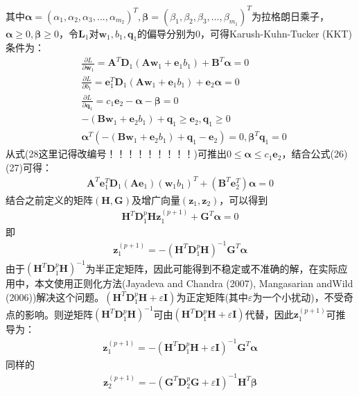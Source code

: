 \documentclass{article}
\theoremstyle{definition}
\theoremstyle{definition}
\theoremstyle{remark}
\begin{document}
其中$\pmb{\alpha}=(\alpha_1,\alpha_2,\alpha_3,…,\alpha_{m_2})^T, \pmb{\beta}=(\beta_1,\beta_2,\beta_3,…,\beta_{m_1})^T$为拉格朗日乘子，$\pmb{\alpha}\geq 0,\pmb{\beta}\geq 0$，令$\pmb{L}_1$对$\mathbf{w}_1,b_1,\mathbf{q}_1$的偏导分别为0，可得Karush-Kuhn-Tucker (KKT)条件为：
\begin{align}
&\frac{\partial{L}}{\partial{\mathbf{w}_1}}=\mathbf{A}^T\mathbf{D}_1(\mathbf{Aw}_1+\mathbf{e}_1b_1)+\mathbf{B}^T\pmb{\alpha}=0\\
&\frac{\partial{L}}{\partial{b_1}}=\mathbf{e}_1^T\mathbf{D}_1(\mathbf{Aw}_1+\mathbf{e}_1b_1)+\mathbf{e}_2\pmb{\alpha}=0\\
&\frac{\partial{L}}{\partial{\mathbf{q}_1}}=c_1\mathbf{e}_2-\pmb{\alpha}-\pmb{\beta}=0\\
&-(\mathbf{Bw}_1+\mathbf{e}_2b_1)+\mathbf{q}_1 \geq \mathbf{e}_2, \mathbf{q}_1\geq 0\\
&\pmb{\alpha}^T(-(\mathbf{Bw}_1+\mathbf{e}_2b_1)+\mathbf{q}_1-\mathbf{e}_2)=0,\pmb{\beta}^T\mathbf{q}_1=0
\end{align}
从式(28这里记得改编号！！！！！！！！！)可推出$0\le \pmb{\alpha} \le c_1\mathbf{e}_2$，结合公式(26)(27)可得：
\begin{align}
\mathbf{A}^T\mathbf{e}_1^T\mathbf{D}_1(\mathbf{Ae}_1)(\mathbf{w}_1b_1)^T+(\mathbf{B}^T\mathbf{e}_2^T)\pmb{\alpha}=0
\end{align}
结合之前定义的矩阵$(\mathbf{H,G})$及增广向量$(\mathbf{z}_1,\mathbf{z}_2)$，可以得到
\begin{align}
\mathbf{H}^T\mathbf{D}_1^p\mathbf{Hz}_1^{(p+1)}+\mathbf{G}^T\pmb{\alpha}=0
\end{align}
即
\begin{align}
\mathbf{z}_1^{(p+1)}=-(\mathbf{H}^T\mathbf{D}_1^p\mathbf{H})^{-1}\mathbf{G}^T\pmb{\alpha}
\end{align}
由于$(\mathbf{H}^T\mathbf{D}_1^p\mathbf{H})^{-1}$为半正定矩阵，因此可能得到不稳定或不准确的解，在实际应用中，本文使用正则化方法(Jayadeva and Chandra (2007), Mangasarian andWild (2006))解决这个问题。$(\mathbf{H}^T\mathbf{D}_1^p\mathbf{H}+\varepsilon \mathbf{I})$为正定矩阵(其中$\varepsilon$为一个小扰动)，不受奇点的影响。则逆矩阵$(\mathbf{H}^T\mathbf{D}_1^p\mathbf{H})^{-1}$可由$(\mathbf{H}^T\mathbf{D}_1^p\mathbf{H}+\varepsilon \mathbf{I})$代替，因此$\mathbf{z}_1^{(p+1)}$可推导为：
\begin{align}
\mathbf{z}_1^{(p+1)}=-(\mathbf{H}^T\mathbf{D}_1^p\mathbf{H}+\varepsilon \mathbf{I})^{-1}\mathbf{G}^T\pmb{\alpha}
\end{align}
同样的
\begin{align}
\mathbf{z}_2^{(p+1)}=-(\mathbf{G}^T\mathbf{D}_2^p\mathbf{G}+\varepsilon \mathbf{I})^{-1}\mathbf{H}^T\pmb{\beta}
\end{align}
\end{document}
